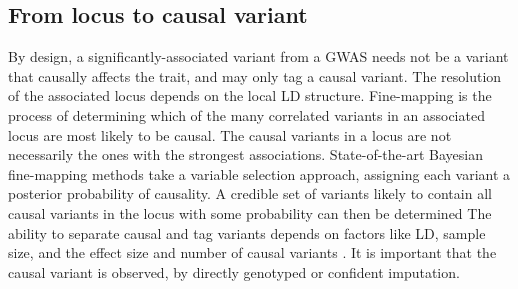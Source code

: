 \begin{outline}
%
%
%
%
%

\subsection{From locus to causal variant}

By design, a significantly-associated variant from a \gls{GWAS} needs not be a variant that causally affects the trait, and may only tag a causal variant.
The resolution of the associated locus depends on the local \gls{LD} structure.
Fine-mapping is the process of determining which of the many correlated variants in an associated locus are most likely to be causal.
The causal variants in a locus are not necessarily the ones with the strongest associations.
State-of-the-art Bayesian fine-mapping methods take a variable selection approach, 
assigning each variant a posterior probability of causality.
A credible set of variants likely to contain all causal variants in the locus with some probability can then be determined
\autocite{schaid2018GenomewideAssociationsCandidate,wang2020SimpleNewApproach} 
The ability to separate causal and tag variants depends on factors like \gls{LD}, sample size, and the effect size and number of causal variants  \autocite{visscher201710YearsGWAS,schaid2018GenomewideAssociationsCandidate}.
It is important that the causal variant is observed, by directly genotyped or confident imputation.


\end{outline}
